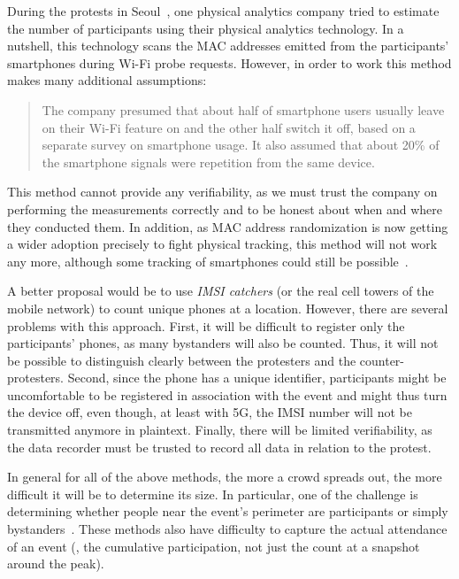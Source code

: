 During the protests in Seoul~\cite{2016DemonstrationsInSeoul}, one physical analytics company tried to estimate the number of participants using their physical analytics technology.
In a nutshell, this technology scans the MAC addresses emitted from the participants' smartphones during Wi-Fi probe requests.
However, in order to work this method makes many additional assumptions:
\blockcquote{2016DemonstrationsInSeoul}{%
The company presumed that about half of smartphone users usually leave on their Wi-Fi feature on and the other half switch it off, based on a separate survey on smartphone usage. 
It also assumed that about 20\% of the smartphone signals were repetition from the same device.
}
This method cannot provide any verifiability, as we must trust the company on performing the measurements correctly and to be honest about when and where they conducted them.
In addition, as MAC address randomization is now getting a wider adoption precisely to fight physical tracking, this method will not work any more, although some tracking of smartphones could still be possible~\cite{WhyMACRandomizationIsNotEnough}.

A better proposal would be to use \emph{IMSI catchers} (or the real cell towers of the mobile network) to count unique phones at a location.
However, there are several problems with this approach.
First, it will be difficult to register only the participants' phones, as many bystanders will also be counted.
Thus, it will not be possible to distinguish clearly between the protesters and the counter-protesters.
Second, since the phone has a unique identifier, participants might be uncomfortable to be registered in association with the event and might thus turn the device off, even though, at least with 5G, the IMSI number will not be transmitted anymore in plaintext. %
Finally, there will be limited verifiability, as the data recorder must be trusted to record all data in relation to the protest.

In general for all of the above methods, the more a crowd spreads out, the more difficult it will be to determine its size.
In particular, one of the challenge is determining whether people near the event's perimeter are participants or simply bystanders~\cite{HowToEstimateCrowdSize}.
These methods also have difficulty to capture the actual attendance of an event (\ie, the cumulative participation, not just the count at a snapshot around the peak).

